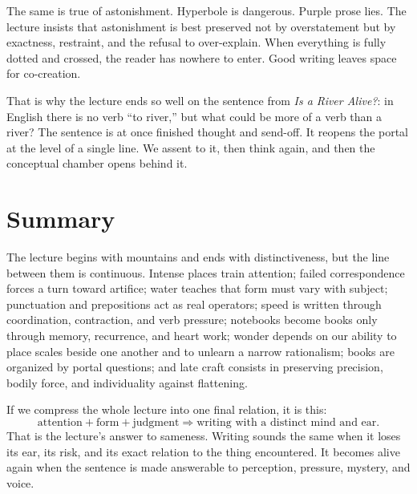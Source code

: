 The same is true of astonishment. Hyperbole is dangerous. Purple prose lies. The lecture insists that astonishment is best preserved not by overstatement but by exactness, restraint, and the refusal to over-explain. When everything is fully dotted and crossed, the reader has nowhere to enter. Good writing leaves space for co-creation.

That is why the lecture ends so well on the sentence from \emph{Is a River Alive?}: in English there is no verb ``to river,'' but what could be more of a verb than a river? The sentence is at once finished thought and send-off. It reopens the portal at the level of a single line. We assent to it, then think again, and then the conceptual chamber opens behind it.

\section{Summary}

The lecture begins with mountains and ends with distinctiveness, but the line between them is continuous. Intense places train attention; failed correspondence forces a turn toward artifice; water teaches that form must vary with subject; punctuation and prepositions act as real operators; speed is written through coordination, contraction, and verb pressure; notebooks become books only through memory, recurrence, and heart work; wonder depends on our ability to place scales beside one another and to unlearn a narrow rationalism; books are organized by portal questions; and late craft consists in preserving precision, bodily force, and individuality against flattening.

If we compress the whole lecture into one final relation, it is this:
\begin{equation}
\text{attention} + \text{form} + \text{judgment} \Longrightarrow \text{writing with a distinct mind and ear}.
\end{equation}
That is the lecture's answer to sameness. Writing sounds the same when it loses its ear, its risk, and its exact relation to the thing encountered. It becomes alive again when the sentence is made answerable to perception, pressure, mystery, and voice.